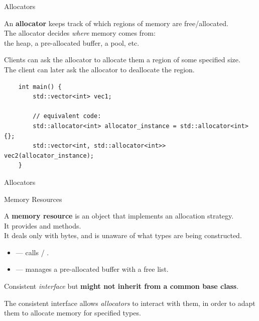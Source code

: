 \begin{frame}[fragile]{Allocators}
  \begin{sqt:definition}
    An \textbf{allocator} keeps track of which regions of memory are free/allocated.\\
    The allocator decides \emph{where} memory comes from: \\
    the heap, a pre-allocated buffer, a pool, etc.
  \end{sqt:definition}
  Clients can ask the allocator to allocate them a region of some specified size.\\
  The client can later ask the allocator to deallocate the region.

  \begin{verbatim}
    int main() {
        std::vector<int> vec1;

        // equivalent code:
        std::allocator<int> allocator_instance = std::allocator<int>{};
        std::vector<int, std::allocator<int>> vec2(allocator_instance);
    }
  \end{verbatim}
\end{frame}

\begin{frame}[fragile]{Allocators}
  
\end{frame}

\begin{frame}[fragile]{Memory Resources}
  \begin{sqt:definition}
    A \textbf{memory resource} is an object that implements an allocation strategy.\\
    It provides  and  methods.\\
    It deals only with bytes, and is unaware of what types are being constructed.
  \end{sqt:definition}
  \begin{itemize}
    \item {} --- calls  / .
    \item {} --- manages a pre-allocated buffer with a free list.
  \end{itemize}
  Consistent \emph{interface} but \textbf{might not inherit from a common base class}.

  \begin{sqt:result}
    The consistent interface allows \emph{allocators} to interact with them,
    in order to adapt them to allocate memory for specified types.
  \end{sqt:result}
\end{frame}

